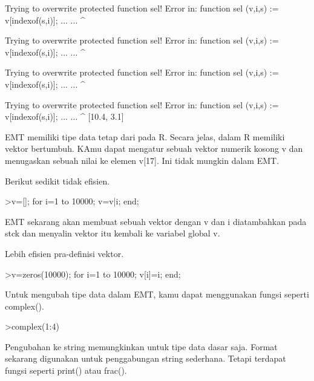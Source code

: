 \documentclass[a4paper,10pt]{article}
\begin{document}
\begin{eulernotebook}
\begin{eulercomment}
\begin{eulercomment}
\begin{eulercomment}
\begin{eulercomment}
\begin{euleroutput}
  Trying to overwrite protected function sel!
  Error in:
  function sel (v,i,s) := v[indexof(s,i)]; ... ...
               ^
  
  Trying to overwrite protected function sel!
  Error in:
  function sel (v,i,s) := v[indexof(s,i)]; ... ...
               ^
  
  Trying to overwrite protected function sel!
  Error in:
  function sel (v,i,s) := v[indexof(s,i)]; ... ...
               ^
  
  Trying to overwrite protected function sel!
  Error in:
  function sel (v,i,s) := v[indexof(s,i)]; ... ...
               ^
  [10.4,  3.1]
\end{euleroutput}
\begin{eulercomment}
EMT memiliki tipe data tetap dari pada R. Secara jelas, dalam R
memiliki vektor bertumbuh. KAmu dapat mengatur sebuah vektor numerik
kosong v dan menugaskan sebuah nilai ke elemen v[17]. Ini tidak
mungkin dalam EMT.

Berikut sedikit tidak efisien.
\end{eulercomment}
\begin{eulerprompt}
>v=[]; for i=1 to 10000; v=v|i; end;
\end{eulerprompt}
\begin{eulercomment}
EMT sekarang akan membuat sebuah vektor dengan v dan i diatambahkan
pada stck dan menyalin vektor itu kembali ke variabel global v.

Lebih efisien pra-definisi vektor.
\end{eulercomment}
\begin{eulerprompt}
>v=zeros(10000); for i=1 to 10000; v[i]=i; end;
\end{eulerprompt}
\begin{eulercomment}
Untuk mengubah tipe data dalam EMT, kamu dapat menggunakan fungsi
seperti complex().
\end{eulercomment}
\begin{eulerprompt}
>complex(1:4)
\end{eulerprompt}
\begin{euleroutput}
  [ 1+0i ,  2+0i ,  3+0i ,  4+0i  ]
\end{euleroutput}
\begin{eulercomment}
Pengubahan ke string memungkinkan untuk tipe data dasar saja. Format
sekarang digunakan untuk penggabungan string sederhana. Tetapi
terdapat fungsi seperti print() atau frac().


\end{eulercomment}
\end{eulercomment}
\end{eulercomment}
\end{eulercomment}
\end{eulercomment}
\end{eulernotebook}
\end{document}

